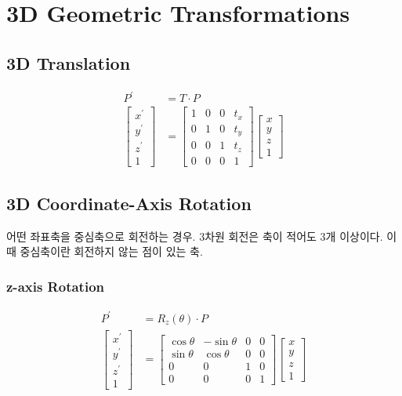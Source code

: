\section{3D Geometric Transformations}

\subsection{3D Translation}

$$
\begin{aligned}
  P^\prime &= T \cdot P \\
  \begin{bmatrix}
    x^\prime \\
    y^\prime \\
    z^\prime \\
    1
  \end{bmatrix}
  &=
  \begin{bmatrix}
    1 & 0 & 0 & t_x \\
    0 & 1 & 0 & t_y \\
    0 & 0 & 1 & t_z \\
    0 & 0 & 0 & 1
  \end{bmatrix}
  \begin{bmatrix}
    x \\
    y \\
    z \\
    1
  \end{bmatrix}
\end{aligned}
$$

\subsection{3D Coordinate-Axis Rotation}

어떤 좌표축을 중심축으로 회전하는 경우. 3차원 회전은 축이 적어도 3개 이상이다. 이때 중심축이란 회전하지 않는 점이 있는 축.

\subsubsection{z-axis Rotation}

$$
\begin{aligned}
  P^\prime &= R_z(\theta) \cdot P \\
  \begin{bmatrix}
    x^\prime \\
    y^\prime \\
    z^\prime \\
    1
  \end{bmatrix}
  &=
  \begin{bmatrix}
    \cos \theta & -\sin \theta & 0 & 0 \\
    \sin \theta & \cos \theta & 0 & 0 \\
    0 & 0 & 1 & 0 \\
    0 & 0 & 0 & 1
  \end{bmatrix}
  \begin{bmatrix}
    x \\
    y \\
    z \\
    1
  \end{bmatrix}
\end{aligned}
$$

